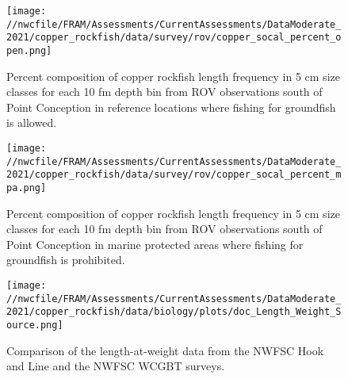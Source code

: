 \documentclass[11pt,
  english,
  a4paper,
]{article}
\begin{document}
\begin{figure}
\centering
\texttt{[image: //nwcfile/FRAM/Assessments/CurrentAssessments/DataModerate\_2021/copper\_rockfish/data/survey/rov/copper\_socal\_percent\_open.png]}
\caption{Percent composition of copper rockfish length frequency in 5 cm size classes for each 10 fm depth bin from ROV observations south of Point Conception in reference locations where fishing for groundfish is allowed.\label{fig:rov-percent-open}}
\end{figure}

\tagmcend\tagstructend

\clearpage


\begin{figure}
\centering
\texttt{[image: //nwcfile/FRAM/Assessments/CurrentAssessments/DataModerate\_2021/copper\_rockfish/data/survey/rov/copper\_socal\_percent\_mpa.png]}
\caption{Percent composition of copper rockfish length frequency in 5 cm size classes for each 10 fm depth bin from ROV observations south of Point Conception in marine protected areas where fishing for groundfish is prohibited.\label{fig:rov-percent-mpa}}
\end{figure}

\tagmcend\tagstructend

\clearpage


\begin{figure}
\centering
\texttt{[image: //nwcfile/FRAM/Assessments/CurrentAssessments/DataModerate\_2021/copper\_rockfish/data/biology/plots/doc\_Length\_Weight\_Source.png]}
\caption{Comparison of the length-at-weight data from the NWFSC Hook and Line and the NWFSC WCGBT surveys.\label{fig:len-weight-survey}}
\end{figure}

\tagmcend\tagstructend

\end{document}
